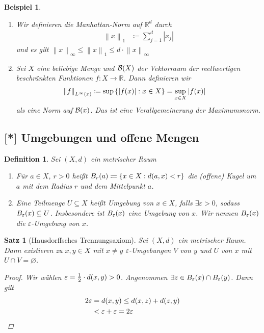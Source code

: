\documentclass[11pt, twoside, a4paper]{article}
\theoremstyle{plain}
\newtheorem{definition}[blockelement]{Definition}
\newtheorem{satz}[blockelement]{Satz}
\newtheorem{beispiel}[blockelement]{Beispiel}
\numberwithin{equation}{subsection}
\newcommand{\set}[1]{\left\{#1\right\}}
\newcommand{\pair}[1]{\left(#1\right)}
\newcommand{\of}[1]{\mathopen{}\mathclose{}\bgroup\left(#1\aftergroup\egroup\right)}
\newcommand{\abs}[1]{\left\lvert#1\right\rvert}
\newcommand{\norm}[1]{\left\lVert#1\right\rVert}
\newcommand{\fromto}{\rightarrow{}}
\renewcommand{\emptyset}{\varnothing}
\newcommand{\R}{\mathbb{R}}
\begin{document}
\begin{beispiel}
\begin{enumerate}
            \item Wir definieren die Manhattan-Norm auf $\R^d$ durch
            \begin{align*}
                \norm{x}_1 &\coloneqq \sum_{j=1}^{d} \abs{x_j}
            \end{align*}
            und es gilt $\norm{x}_{\infty} \leq \norm{x}_1 \leq d \cdot \norm{x}_{\infty}$
            \item Sei $X$ eine beliebige Menge und $\mathcal{B}\of{X}$ der Vektorraum der reellwertigen beschränkten Funktionen $f: X\fromto \R$. Dann definieren wir
            \begin{align*}
                \norm{f}_{L^{\infty}\of{x}} &\coloneqq \sup\set{\abs{f\of{x}}: x\in X} = \sup_{x\in X} \abs{f\of{x}}
            \end{align*}
            als eine Norm auf $\mathcal{B}\of{x}$. Das ist eine Verallgemeinerung der Maximumsnorm.
        \end{enumerate}
    \end{beispiel}

    \subsection{[*] Umgebungen und offene Mengen}

    \begin{definition}
        Sei $\pair{X, d}$ ein metrischer Raum
        \begin{enumerate}[label=(\alph*)]
            \item Für $a\in X$, $r > 0$ heißt $B_r\of{a} \coloneqq \set{x\in X: d\of{a, x} < r}$ die (offene) Kugel um $a$ mit dem Radius $r$ und dem Mittelpunkt $a$.
            \item Eine Teilmenge $U\subseteq X$ heißt \emph{Umgebung} von $x\in X$, falls $\exists\varepsilon > 0$, sodass $B_{\varepsilon}\of{x} \subseteq U$. Insbesondere ist $B_{\varepsilon}\of{x}$ eine Umgebung von $x$. Wir nennen $B_{\varepsilon}\of{x}$ die $\varepsilon$-Umgebung von $x$.
        \end{enumerate}
    \end{definition}

    \begin{satz}[Hausdorffsches Trennungsaxiom]
        \label{satz:hausdorff-trennungsaxiom}
        Sei $\pair{X, d}$ ein metrischer Raum. Dann existieren zu $x,y\in X$ mit $x\neq y$ $\varepsilon$-Umgebungen $V$ von $y$ und $U$ von $x$ mit $U\cap V = \emptyset$.
        \begin{proof}
            Wir wählen $\varepsilon = \frac{1}{2}\cdot d\of{x,y} > 0$. Angenommen $\exists z\in B_{\varepsilon}\of{x} \cap B_{\varepsilon}\of{y}$. Dann gilt
            \begin{align*}
                2\varepsilon &= d\of{x,y} \leq d\of{x,z} + d\of{z,y}\\
                &< \varepsilon + \varepsilon = 2\varepsilon\qedhere
            \end{align*}
        \end{proof}
    \end{satz}
\end{document}
